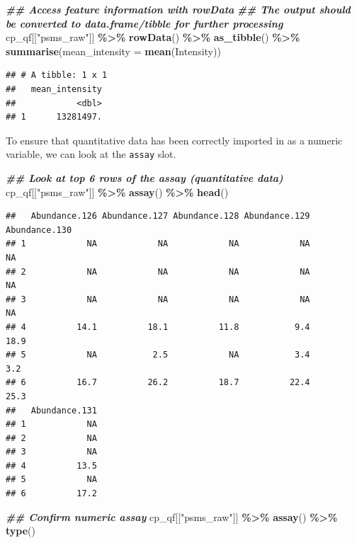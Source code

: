 \documentclass[9pt,a4paper,]{extarticle}
\newenvironment{Shaded}{\begin{snugshade}}{\end{snugshade}}
\newcommand{\AttributeTok}[1]{\textcolor[rgb]{0.13,0.29,0.53}{#1}}
\newcommand{\DocumentationTok}[1]{\textcolor[rgb]{0.56,0.35,0.01}{\textbf{\textit{#1}}}}
\newcommand{\FunctionTok}[1]{\textcolor[rgb]{0.13,0.29,0.53}{\textbf{#1}}}
\newcommand{\NormalTok}[1]{#1}
\newcommand{\SpecialCharTok}[1]{\textcolor[rgb]{0.81,0.36,0.00}{\textbf{#1}}}
\newcommand{\StringTok}[1]{\textcolor[rgb]{0.31,0.60,0.02}{#1}}
\begin{document}
\begin{Shaded}
\begin{Highlighting}[]
\DocumentationTok{\#\# Access feature information with rowData}
\DocumentationTok{\#\# The output should be converted to data.frame/tibble for further processing}
\NormalTok{cp\_qf[[}\StringTok{"psms\_raw"}\NormalTok{]] }\SpecialCharTok{\%\textgreater{}\%} 
  \FunctionTok{rowData}\NormalTok{() }\SpecialCharTok{\%\textgreater{}\%} 
  \FunctionTok{as\_tibble}\NormalTok{() }\SpecialCharTok{\%\textgreater{}\%} 
  \FunctionTok{summarise}\NormalTok{(}\AttributeTok{mean\_intensity =} \FunctionTok{mean}\NormalTok{(Intensity))}
\end{Highlighting}
\end{Shaded}

\begin{verbatim}
## # A tibble: 1 x 1
##   mean_intensity
##            <dbl>
## 1      13281497.
\end{verbatim}

To ensure that quantitative data has been correctly imported in as a numeric
variable, we can look at the \texttt{assay} slot.

\begin{Shaded}
\begin{Highlighting}[]
\DocumentationTok{\#\# Look at top 6 rows of the assay (quantitative data)}
\NormalTok{cp\_qf[[}\StringTok{"psms\_raw"}\NormalTok{]] }\SpecialCharTok{\%\textgreater{}\%}
  \FunctionTok{assay}\NormalTok{() }\SpecialCharTok{\%\textgreater{}\%}
  \FunctionTok{head}\NormalTok{() }
\end{Highlighting}
\end{Shaded}

\begin{verbatim}
##   Abundance.126 Abundance.127 Abundance.128 Abundance.129 Abundance.130
## 1            NA            NA            NA            NA            NA
## 2            NA            NA            NA            NA            NA
## 3            NA            NA            NA            NA            NA
## 4          14.1          18.1          11.8           9.4          18.9
## 5            NA           2.5            NA           3.4           3.2
## 6          16.7          26.2          18.7          22.4          25.3
##   Abundance.131
## 1            NA
## 2            NA
## 3            NA
## 4          13.5
## 5            NA
## 6          17.2
\end{verbatim}

\begin{Shaded}
\begin{Highlighting}[]
\DocumentationTok{\#\# Confirm numeric assay}
\NormalTok{cp\_qf[[}\StringTok{"psms\_raw"}\NormalTok{]] }\SpecialCharTok{\%\textgreater{}\%}
  \FunctionTok{assay}\NormalTok{() }\SpecialCharTok{\%\textgreater{}\%}
  \FunctionTok{type}\NormalTok{()}
\end{Highlighting}
\end{Shaded}
\end{document}
